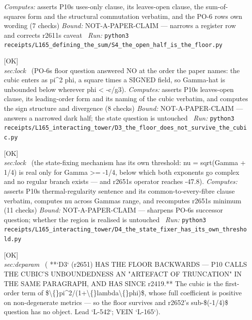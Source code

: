 \begin{description}
\emph{Computes:} asserts P10s uses-only clause, its leaves-open clause, the sum-of-squares form and the structural commutation verbatim, and the PO-6 rows own wording (7 checks)
 \emph{Bound:} NOT-A-PAPER-CLAIM --- narrows a register row and corrects r2611s caveat
\ \emph{Run:} \texttt{python3 receipts/L165\_defining\_the\_sum/S4\_the\_open\_half\_is\_the\_floor.py}
\item[\label{rcpt:D3_the_floor_does_not_survive_the_cubic}\textbf{}\quad\texttt{D3\_the\_floor\_does\_not\_survive\_the\_cubic}]\hfill\textsf{[OK]}\\
\textit{sec:lock} \ (PO-6s floor question answered NO at the order the paper names: the cubic enters as pi\textasciicircum{}2 phi, a square times a SIGNED field, so Gamma-hat is unbounded below wherever phi < -c/g3). 
\emph{Computes:} asserts P10s leaves-open clause, its leading-order form and its naming of the cubic verbatim, and computes the sign structure and divergence (8 checks)
 \emph{Bound:} NOT-A-PAPER-CLAIM --- answers a narrowed dark half; the state question is untouched
\ \emph{Run:} \texttt{python3 receipts/L165\_interacting\_tower/D3\_the\_floor\_does\_not\_survive\_the\_cubic.py}
\item[\label{rcpt:D4_the_state_fixer_has_its_own_threshold}\textbf{}\quad\texttt{D4\_the\_state\_fixer\_has\_its\_own\_threshold}]\hfill\textsf{[OK]}\\
\textit{sec:lock} \ (the state-fixing mechanism has its own threshold: nu = sqrt(Gamma + 1/4) is real only for Gamma >= -1/4, below which both exponents go complex and no regular branch exists --- and r2651s operator reaches -47.8). 
\emph{Computes:} asserts P10s thermal-regularity sentence and its common-to-every-fibre clause verbatim, computes nu across Gammas range, and recomputes r2651s minimum (11 checks)
 \emph{Bound:} NOT-A-PAPER-CLAIM --- sharpens PO-6s successor question; whether the region is realised is untouched
\ \emph{Run:} \texttt{python3 receipts/L165\_interacting\_tower/D4\_the\_state\_fixer\_has\_its\_own\_threshold.py}
\item[\label{rcpt:D50_the_floor_does_survive_and_the_paper_said_so_232_revisions_earlier}\textbf{}\quad\texttt{D50\_the\_floor\_does\_survive\_and\_the\_paper\_said\_so\_232\_revisions\_earlier}]\hfill\textsf{[OK]}\\
\textit{sec:deparam} \ ( **`D3` (r2651) HAS THE FLOOR BACKWARDS --- P10 CALLS THE CUBIC'S UNBOUNDEDNESS AN "ARTEFACT OF TRUNCATION" IN THE SAME PARAGRAPH, AND HAS SINCE r2419.** The cubic is the first-order term of \$\textbackslash\{\}pi\textasciicircum{}2/(1+\textbackslash\{\}lambda\textbackslash\{\}phi)\$, whose full coefficient is positive on non-degenerate metrics --- so the floor survives and r2652's sub-\$(-1/4)\$ question has no object. Lead `L-542`; VEIN `L-165`). 

\end{description}
